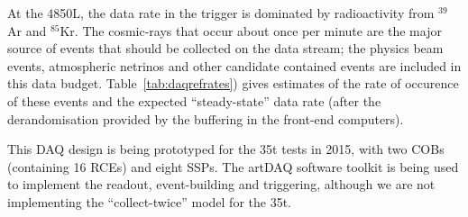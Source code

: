 At the 4850L, the data rate in the trigger is dominated by
radioactivity from $^{39}$Ar and $^{85}$Kr.  The cosmic-rays that
occur about once per minute are the major source of events that should
be collected on the data stream; the physics beam events, atmospheric
netrinos and other candidate contained events are included in this
data budget.  Table~\ref{tab:daqrefrates}) gives estimates of the
rate of occurence of these events and the expected ``steady-state'' data rate
(after the derandomisation provided by the buffering in the front-end
computers).

This DAQ design is being prototyped for the 35t tests in 2015, with
two COBs (containing 16 RCEs) and eight SSPs.  The artDAQ software
toolkit is being used to implement the readout, event-building and
triggering, although we are not implementing the ``collect-twice''
model for the 35t.

%
